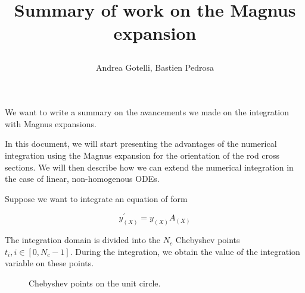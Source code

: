 \documentclass[12pt,a4paper]{article}
\title{\textbf{Summary of work on the Magnus expansion}
\author{Andrea Gotelli, Bastien Pedrosa}
}
\begin{document}
\maketitle

We want to write a summary on the avancements we made on the integration with Magnus expansions.

In this document, we will start presenting the advantages of the numerical integration using the Magnus expansion for the orientation of the rod cross sections. We will then describe how we can extend the numerical integration in the case of linear, non-homogenous ODEs.

Suppose we want to integrate an equation of form

\begin{equation}
	y_{(X)}^\prime = y_{(X)} A_{(X)}
\end{equation}

The integration domain is divided into the $N_c$ Chebyshev points $t_i, i \in [0, N_c -1]$. During the integration, we obtain the value of the integration variable on these points.


\begin{figure}
		\centering
		\caption{Chebyshev points on the unit circle.}
		\label{fig:cheb points}
		\end{figure}
\end{document}
